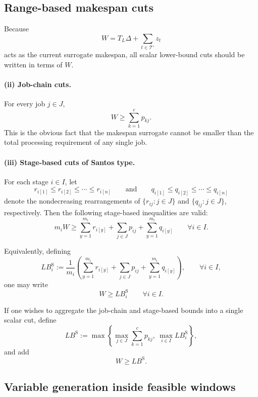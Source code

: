 \documentclass[11pt]{article}
\begin{document}
\subsection{Range-based makespan cuts}

Because
\[
W=T_L\Delta+\sum_{t\in\mathcal T'} z_t
\]
acts as the current surrogate makespan, all scalar lower-bound cuts should be written in terms of $W$.


\paragraph{(ii) Job-chain cuts.}
For every job $j\in J$,
\begin{equation}
W \ge \sum_{k=1}^{c} p_{kj}.
\label{eq:range-job-chain-cut}
\end{equation}
This is the obvious fact that the makespan surrogate cannot be smaller than the total processing requirement of any single job.

\paragraph{(iii) Stage-based cuts of Santos type.}
For each stage $i\in I$, let
\[
r_{i[1]}\le r_{i[2]}\le \cdots \le r_{i[n]}
\qquad\text{and}\qquad
q_{i[1]}\le q_{i[2]}\le \cdots \le q_{i[n]}
\]
denote the nondecreasing rearrangements of $\{r_{ij}:j\in J\}$ and $\{q_{ij}:j\in J\}$, respectively.
Then the following stage-based inequalities are valid:
\begin{equation}
m_i W
\ge
\sum_{y=1}^{m_i} r_{i[y]}
+
\sum_{j\in J} p_{ij}
+
\sum_{y=1}^{m_i} q_{i[y]}
\qquad \forall i\in I.
\label{eq:range-santos-stage-cut}
\end{equation}

Equivalently, defining
\[
LB_i^{\mathrm S}
:=
\frac{1}{m_i}
\left(
\sum_{y=1}^{m_i} r_{i[y]}
+
\sum_{j\in J} p_{ij}
+
\sum_{y=1}^{m_i} q_{i[y]}
\right),
\qquad \forall i\in I,
\]
one may write
\[
W \ge LB_i^{\mathrm S}
\qquad \forall i\in I.
\]

If one wishes to aggregate the job-chain and stage-based bounds into a single scalar cut, define
\[
LB^{\mathrm S}
:=
\max\left\{
\max_{j\in J}\sum_{k=1}^{c} p_{kj},
\ \max_{i\in I} LB_i^{\mathrm S}
\right\},
\]
and add
\begin{equation}
W \ge LB^{\mathrm S}.
\label{eq:range-santos-global-cut}
\end{equation}

\subsection{Variable generation inside feasible windows}
\end{document}
